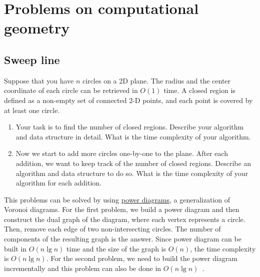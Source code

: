 \chapter{Problems on computational geometry}

\section{Sweep line}
\begin{Exercise}[title={Power diagrams},origin={NTU CSIE 103},difficulty=2]
Suppose that you have $n$ circles on a 2D plane. The radius and the center coordinate of each circle can be retrieved in $O(1)$ time. A closed region is defined as a non-empty set of connected 2-D points, and each point is covered by at least one circle.
\begin{enumerate}
\item Your task is to find the number of closed regions. Describe your algorithm and data structure in detail. What is the time complexity of your algorithm.
\item Now we start to add more circles one-by-one to the plane. After each addition, we want to keep track of the number of closed regions. Describe an algorithm and data structure to do so. What is the time complexity of your algorithm for each addition.
\end{enumerate}
\end{Exercise}
\begin{Answer}
This problems can be solved by using \href{https://en.wikipedia.org/wiki/Power_diagram}{power diagrams}, a generalization of Voronoi diagrams. For the first problem, we build a power diagram and then construct the dual graph of the diagram, where each vertex represents a circle. Then, remove each edge of two non-intersecting circles. The number of components of the resulting graph is the answer. Since power diagram can be built in $O(n \lg n)$ time and the size of the graph is $O(n)$, the time complexity is $O(n \lg n)$. For the second problem, we need to build the power diagram incrementally and this problem can also be done in $O(n \lg n)$~\cite{Aurenhammer1988}.
\end{Answer}


